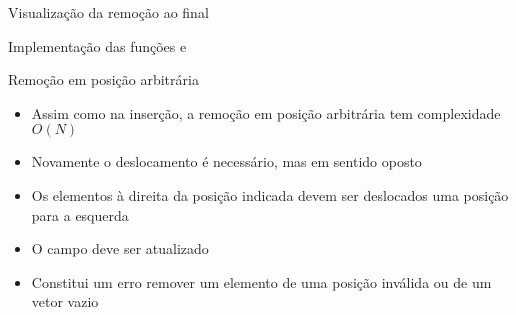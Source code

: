\begin{frame}[fragile]{Visualização da remoção ao final}


\end{frame}


\begin{frame}[fragile]{Implementação das funções  e }
\end{frame}

\begin{frame}[fragile]{Remoção em posição arbitrária}

    \begin{itemize}
        \item Assim como na inserção, a remoção em posição arbitrária tem complexidade
        $O(N)$

        \item Novamente o deslocamento é necessário, mas em sentido oposto

        \item Os elementos à direita da posição indicada devem ser deslocados uma posição para a
            esquerda

        \item O campo  deve ser atualizado

        \item Constitui um erro remover um elemento de uma posição inválida ou de um vetor
        vazio
    \end{itemize}

\end{frame}

